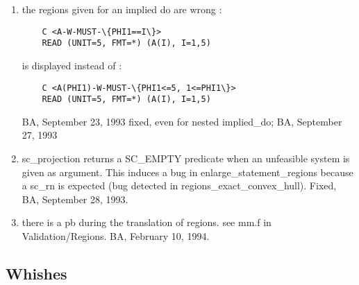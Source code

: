 \begin{enumerate}
  \item the regions given for an implied do are wrong :
	\begin{verbatim}
	C <A-W-MUST-\{PHI1==I\}>
	READ (UNIT=5, FMT=*) (A(I), I=1,5)
	\end{verbatim}
	is displayed instead of :
	\begin{verbatim}
	C <A(PHI1)-W-MUST-\{PHI1<=5, 1<=PHI1\}>
	READ (UNIT=5, FMT=*) (A(I), I=1,5)
	\end{verbatim}
	BA, September 23, 1993
	fixed, even for nested implied_do; BA, September 27, 1993

  \item sc_projection returns a SC_EMPTY predicate when an unfeasible
	system is given as argument. This induces a bug in
	enlarge_statement_regions because a sc_rn is expected (bug
	detected in regions_exact_convex_hull).
	Fixed, BA, September 28, 1993.

  \item there is a pb during the translation of regions. see mm.f in
	Validation/Regions. BA, February 10, 1994.


\end{enumerate}

\subsection{Whishes}

